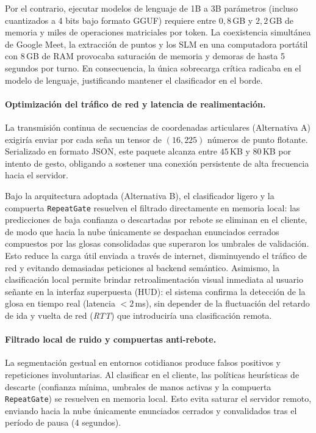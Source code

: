 Por el contrario, ejecutar modelos de lenguaje de 1B a 3B parámetros (incluso cuantizados a 4 bits bajo formato GGUF) requiere entre $0{,}8$\,GB y $2{,}2$\,GB de memoria y miles de operaciones matriciales por token. La coexistencia simultánea de Google Meet, la extracción de puntos y los SLM en una computadora portátil con 8\,GB de RAM provocaba saturación de memoria y demoras de hasta 5 segundos por turno. En consecuencia, la única sobrecarga crítica radicaba en el modelo de lenguaje, justificando mantener el clasificador en el borde.

\paragraph{Optimización del tráfico de red y latencia de realimentación.}
La transmisión continua de secuencias de coordenadas articulares (Alternativa A) exigiría enviar por cada seña un tensor de $(16, 225)$ números de punto flotante. Serializado en formato JSON, este paquete alcanza entre $45$\,KB y $80$\,KB por intento de gesto, obligando a sostener una conexión persistente de alta frecuencia hacia el servidor. 

Bajo la arquitectura adoptada (Alternativa B), el clasificador ligero y la compuerta \texttt{RepeatGate} resuelven el filtrado directamente en memoria local: las predicciones de baja confianza o descartadas por rebote se eliminan en el cliente, de modo que hacia la nube únicamente se despachan enunciados cerrados compuestos por las glosas consolidadas que superaron los umbrales de validación. Esto reduce la carga útil enviada a través de internet, disminuyendo el tráfico de red y evitando demasiadas peticiones al backend semántico.
Asimismo, la clasificación local permite brindar retroalimentación visual inmediata al usuario señante en la interfaz superpuesta (HUD): el sistema confirma la detección de la glosa en tiempo real (latencia $<2$\,ms), sin depender de la fluctuación del retardo de ida y vuelta de red (\textit{RTT}) que introduciría una clasificación remota.

\paragraph{Filtrado local de ruido y compuertas anti-rebote.}
La segmentación gestual en entornos cotidianos produce falsos positivos y repeticiones involuntarias. Al clasificar en el cliente, las políticas heurísticas de descarte (confianza mínima, umbrales de manos activas y la compuerta \texttt{RepeatGate}) se resuelven en memoria local. Esto evita saturar el servidor remoto, enviando hacia la nube únicamente enunciados cerrados y convalidados tras el período de pausa (4 segundos).

